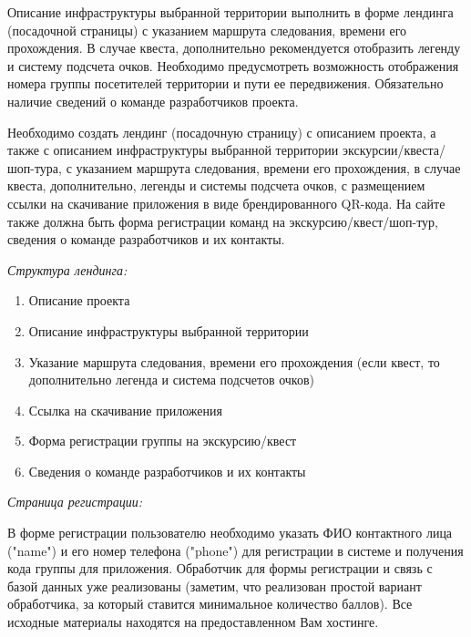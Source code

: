
Описание инфраструктуры выбранной территории выполнить в форме лендинга (посадочной страницы) с указанием маршрута следования, времени его прохождения. В случае квеста, дополнительно рекомендуется отобразить легенду и систему подсчета очков. Необходимо предусмотреть возможность отображения номера группы посетителей территории и пути ее передвижения. Обязательно наличие сведений о команде разработчиков проекта.

Необходимо создать лендинг (посадочную страницу) с описанием проекта, а также с описанием инфраструктуры выбранной территории экскурсии/квеста/шоп-тура, с указанием маршрута следования, времени его прохождения, в случае квеста, дополнительно, легенды и системы подсчета очков, с размещением ссылки на скачивание приложения в виде брендированного QR-кода. На сайте также должна быть форма регистрации команд на экскурсию/квест/шоп-тур, сведения о команде разработчиков и их контакты.

\textit{Структура лендинга:}

\begin{enumerate} 
    \item Описание проекта
    \item Описание инфраструктуры выбранной территории
    \item Указание маршрута следования, времени его прохождения (если квест, то дополнительно легенда и система подсчетов очков)
    \item Ссылка на скачивание приложения
    \item Форма регистрации группы на экскурсию/квест
    \item Сведения о команде разработчиков и их контакты
\end{enumerate}

\textit{Страница регистрации:}

В форме регистрации пользователю необходимо указать ФИО контактного лица ("name") и его номер телефона ("phone") для регистрации в системе и получения кода группы для приложения. 
Обработчик для формы регистрации и связь с базой данных уже реализованы (заметим, что реализован простой вариант обработчика, за который ставится минимальное количество баллов). Все исходные материалы находятся на предоставленном Вам хостинге.

